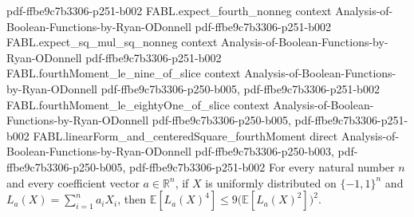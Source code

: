 \begin{theorem}
  {pdf-ffbe9c7b3306-p251-b002}
\proofstep
  {FABL.expect_fourth_nonneg}
  {context}
  {Analysis-of-Boolean-Functions-by-Ryan-ODonnell}
  {pdf-ffbe9c7b3306-p251-b002}
\proofstep
  {FABL.expect_sq_mul_sq_nonneg}
  {context}
  {Analysis-of-Boolean-Functions-by-Ryan-ODonnell}
  {pdf-ffbe9c7b3306-p251-b002}
\proofstep
  {FABL.fourthMoment_le_nine_of_slice}
  {context}
  {Analysis-of-Boolean-Functions-by-Ryan-ODonnell}
  {pdf-ffbe9c7b3306-p250-b005,
    pdf-ffbe9c7b3306-p251-b002}
\proofstep
  {FABL.fourthMoment_le_eightyOne_of_slice}
  {context}
  {Analysis-of-Boolean-Functions-by-Ryan-ODonnell}
  {pdf-ffbe9c7b3306-p250-b005,
    pdf-ffbe9c7b3306-p251-b002}
\proofstep
  {FABL.linearForm_and_centeredSquare_fourthMoment}
  {direct}
  {Analysis-of-Boolean-Functions-by-Ryan-ODonnell}
  {pdf-ffbe9c7b3306-p250-b003,
    pdf-ffbe9c7b3306-p250-b005,
    pdf-ffbe9c7b3306-p251-b002}
For every natural number $n$ and every coefficient vector $a\in\mathbb{R}^n$, if $X$ is
uniformly distributed on $\{-1,1\}^n$ and $L_a(X)=\sum_{i=1}^n a_iX_i$, then
$\mathbb{E}[L_a(X)^4]\le 9\bigl(\mathbb{E}[L_a(X)^2]\bigr)^2$.
\end{theorem}

